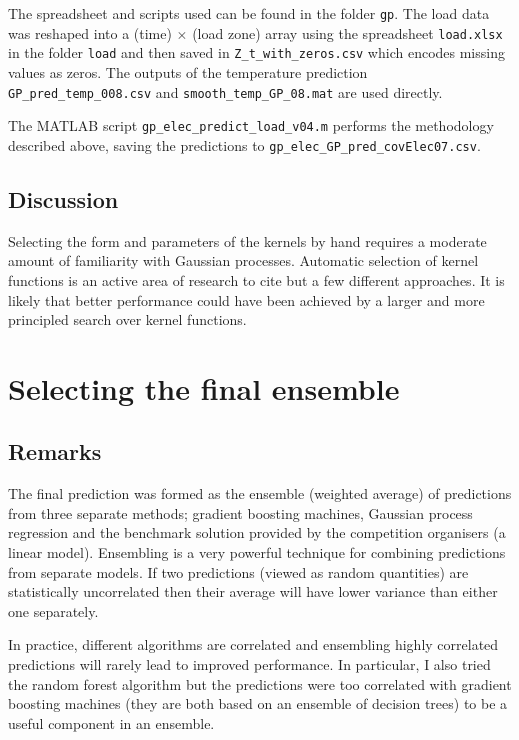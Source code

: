 \documentclass[preprint,authoryear,12pt]{elsarticle}
\begin{document}
The spreadsheet and scripts used can be found in the folder \texttt{gp}.
The load data was reshaped into a (time) $\times$ (load zone) array using the spreadsheet \texttt{load.xlsx} in the folder \texttt{load} and then saved in \texttt{Z\_t\_with\_zeros.csv} which encodes missing values as zeros.
The outputs of the temperature prediction \texttt{GP\_pred\_temp\_008.csv} and \texttt{smooth\_temp\_GP\_08.mat} are used directly.

The MATLAB script \texttt{gp\_elec\_predict\_load\_v04.m} performs the methodology described above, saving the predictions to \texttt{gp\_elec\_GP\_pred\_covElec07.csv}.

\subsection{Discussion}

Selecting the form and parameters of the kernels by hand requires a moderate amount of familiarity with Gaussian processes.
Automatic selection of kernel functions is an active area of research \citep[e.g.][]{DBLP:journals/corr/abs-0909-0844, diosan2007evolving, duvenaud2011additive11} to cite but a few different approaches.
It is likely that better performance could have been achieved by a larger and more principled search over kernel functions.

\section{Selecting the final ensemble}

\subsection{Remarks}

The final prediction was formed as the ensemble (weighted average) of predictions from three separate methods; gradient boosting machines, Gaussian process regression and the benchmark solution provided by the competition organisers (a linear model).
Ensembling is a very powerful technique for combining predictions from separate models.
If two predictions (viewed as random quantities) are statistically uncorrelated then their average will have lower variance than either one separately.

In practice, different algorithms are correlated and ensembling highly correlated predictions will rarely lead to improved performance.
In particular, I also tried the random forest algorithm but the predictions were too correlated with gradient boosting machines (they are both based on an ensemble of decision trees) to be a useful component in an ensemble.
\end{document}
